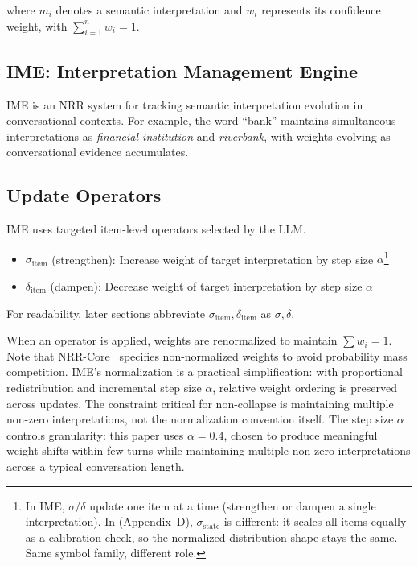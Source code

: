 \documentclass[11pt,a4paper]{article}
\begin{document}
where $m_i$ denotes a semantic interpretation and $w_i$ represents its confidence
weight, with $\sum_{i=1}^{n} w_i = 1$.

\subsection{IME: Interpretation Management Engine}

IME is an NRR system for tracking semantic interpretation evolution in
conversational contexts. For example, the word ``bank''
maintains simultaneous interpretations as \textit{financial institution} and
\textit{riverbank}, with weights evolving as conversational evidence accumulates.

\subsection{Update Operators}

IME uses targeted item-level operators selected by the LLM.

\begin{itemize}
    \item $\sigma_{\text{item}}$ (strengthen): Increase weight of target interpretation by step
    size $\alpha$\footnote{In IME, $\sigma$/$\delta$ update one item at a time (strengthen or dampen a single interpretation). In \cite{saito2026phi} (Appendix~D), $\sigma_{\mathrm{state}}$ is different: it scales all items equally as a calibration check, so the normalized distribution shape stays the same. Same symbol family, different role.}
    \item $\delta_{\text{item}}$ (dampen): Decrease weight of target interpretation by step
          size $\alpha$
\end{itemize}

For readability, later sections abbreviate $\sigma_{\text{item}}, \delta_{\text{item}}$ as $\sigma, \delta$.

When an operator is applied, weights are renormalized to maintain $\sum w_i = 1$.
Note that NRR-Core~\cite{saito2025nrr} specifies non-normalized weights to avoid
probability mass competition. IME's normalization is a practical simplification:
with proportional redistribution and incremental step size $\alpha$, relative
weight ordering is preserved across updates. The constraint critical for
non-collapse is maintaining multiple non-zero interpretations, not the
normalization convention itself.
The step size $\alpha$ controls granularity: this paper uses $\alpha = 0.4$,
chosen to produce meaningful weight shifts within few turns while maintaining
multiple non-zero interpretations across a typical conversation length.
\end{document}
